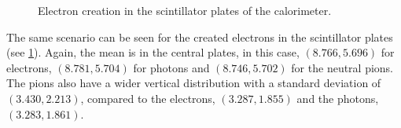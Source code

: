 \begin{figure}[htb!]
   \hspace{1em}

  \caption{Electron creation in the scintillator plates of the calorimeter.}\label{fig:electrons-creation-scintillator}

\end{figure}

The same scenario can be seen for the created electrons in the scintillator
plates (see \cref{fig:electrons-creation-scintillator}). Again, the mean is in
the central plates, in this case, \((8.766, 5.696)\) for electrons, \((8.781,
5.704)\) for photons and \((8.746, 5.702)\) for the neutral pions. The pions
also have a wider vertical distribution with a standard deviation of \((3.430,
2.213)\), compared to the electrons, \((3.287, 1.855)\) and the photons,
\((3.283, 1.861)\).

